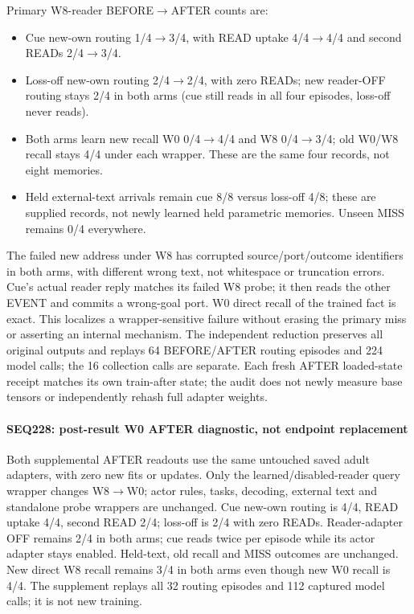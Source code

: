 \documentclass[11pt]{article}
\begin{document}
Primary W8-reader BEFORE$\to$AFTER counts are:

\begin{itemize}
\item Cue new-own routing 1/4$\to$3/4, with READ uptake 4/4$\to$4/4 and second READs 2/4$\to$3/4.
\item Loss-off new-own routing 2/4$\to$2/4, with zero READs; new reader-OFF routing stays
  2/4 in both arms (cue still reads in all four episodes, loss-off never reads).
\item Both arms learn new recall W0 0/4$\to$4/4 and W8 0/4$\to$3/4; old W0/W8 recall stays
  4/4 under each wrapper. These are the same four records, not eight memories.
\item Held external-text arrivals remain cue 8/8 versus loss-off 4/8; these are
  supplied records, not newly learned held parametric memories. Unseen MISS
  remains 0/4 everywhere.
\end{itemize}

The failed new address under W8 has corrupted source/port/outcome identifiers
in both arms, with different wrong text, not whitespace or truncation errors.
Cue's actual reader reply matches its failed W8 probe; it then reads the other
EVENT and commits a wrong-goal port. W0 direct recall of the trained fact is
exact. This localizes a wrapper-sensitive failure without erasing the primary
miss or asserting an internal mechanism. The independent reduction preserves
all original outputs and replays 64 BEFORE/AFTER routing episodes and 224 model
calls; the 16 collection calls are separate. Each fresh AFTER loaded-state
receipt matches its own train-after state; the audit does not newly measure
base tensors or independently rehash full adapter weights.

\paragraph{SEQ228: post-result W0 AFTER diagnostic, not endpoint replacement}

Both supplemental AFTER readouts use the same untouched saved adult adapters,
with zero new fits or updates. Only the learned/disabled-reader query wrapper
changes W8$\to$W0; actor rules, tasks, decoding, external text and standalone probe
wrappers are unchanged. Cue new-own routing is 4/4, READ uptake 4/4, second READ
2/4; loss-off is 2/4 with zero READs. Reader-adapter OFF remains 2/4 in both arms;
cue reads twice per episode while its actor adapter stays enabled. Held-text,
old recall and MISS outcomes are unchanged. New direct W8 recall remains 3/4
in both arms even though new W0 recall is 4/4. The supplement replays all 32
routing episodes and 112 captured model calls; it is not new training.
\end{document}
